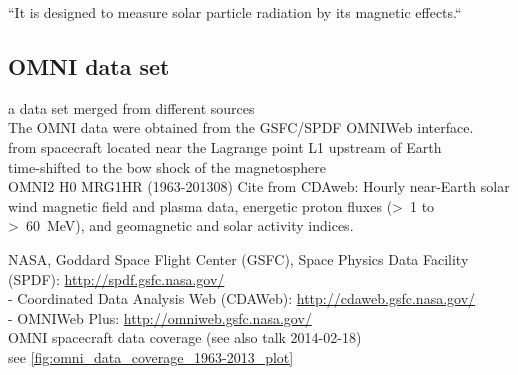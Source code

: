 ``It is designed to measure solar particle radiation by its magnetic effects.``\\



\subsection{OMNI data set}
\label{sec:omni_data_set}

a data set merged from different sources\\
The OMNI data \citep{King2005} were obtained from the GSFC/SPDF OMNIWeb interface.\\

from spacecraft located near the Lagrange point L1 upstream of Earth\\
time-shifted to the bow shock of the magnetosphere\\

OMNI2 H0 MRG1HR (1963-201308)
Cite from CDAweb: Hourly near-Earth solar wind magnetic field and plasma data, energetic proton fluxes (>~1 to >~60~MeV), and geomagnetic and solar activity indices.

NASA, Goddard Space Flight Center (GSFC), Space Physics Data Facility (SPDF): \url{http://spdf.gsfc.nasa.gov/}\\	%
- Coordinated Data Analysis Web (CDAWeb): \url{http://cdaweb.gsfc.nasa.gov/}\\	%
- OMNIWeb Plus: \url{http://omniweb.gsfc.nasa.gov/}\\	%


OMNI spacecraft data coverage (see also talk 2014-02-18)\\
see \autoref{fig:omni_data_coverage_1963-2013_plot}
\begin{figure}[htb]
\end{figure}


